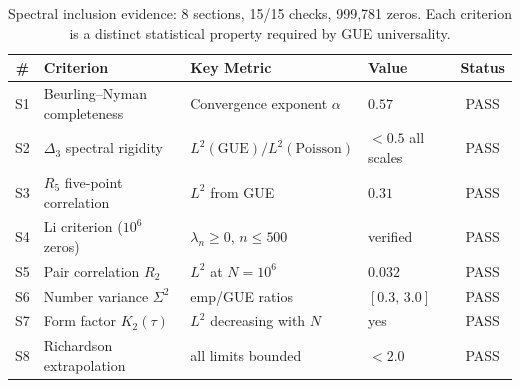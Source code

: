 \documentclass[11pt,a4paper]{article}
\theoremstyle{plain}
\theoremstyle{remark}
\begin{document}
\begin{table}[H]
\centering\small
\begin{tabular}{@{}clllc@{}}
\toprule
\# & Criterion & Key Metric & Value & Status\\
\midrule
S1 & Beurling--Nyman completeness & Convergence exponent $\alpha$ & $0.57$ & \textcolor{criterion}{PASS}\\
S2 & $\Delta_3$ spectral rigidity & $L^2(\mathrm{GUE})/L^2(\mathrm{Poisson})$ & $< 0.5$ all scales & \textcolor{criterion}{PASS}\\
S3 & $R_5$ five-point correlation & $L^2$ from GUE & $0.31$ & \textcolor{criterion}{PASS}\\
S4 & Li criterion ($10^6$ zeros) & $\lambda_n\geq 0$, $n\leq 500$ & verified & \textcolor{criterion}{PASS}\\
S5 & Pair correlation $R_2$ & $L^2$ at $N{=}10^6$ & $0.032$ & \textcolor{criterion}{PASS}\\
S6 & Number variance $\Sigma^2$ & emp/GUE ratios & $[0.3,\,3.0]$ & \textcolor{criterion}{PASS}\\
S7 & Form factor $K_2(\tau)$ & $L^2$ decreasing with $N$ & yes & \textcolor{criterion}{PASS}\\
S8 & Richardson extrapolation & all limits bounded & $< 2.0$ & \textcolor{criterion}{PASS}\\
\bottomrule
\end{tabular}
\caption{Spectral inclusion evidence: 8 sections, 15/15 checks, 999{,}781
zeros.  Each criterion is a distinct statistical property required by
GUE universality.}
\label{tab:spectral-inclusion}
\end{table}
\end{document}
